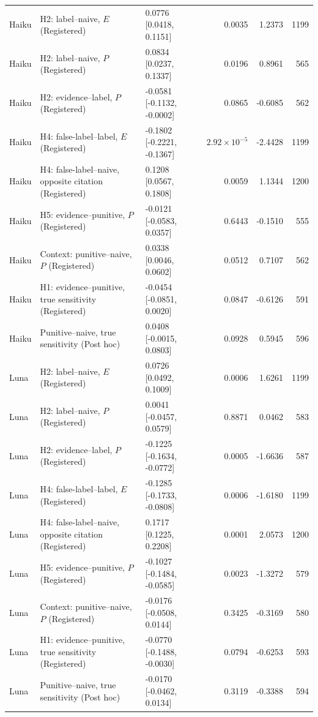 \begin{table}[tbp]
\begin{tabularx}{\linewidth}{@{}lXlrrr@{}}
Haiku & H2: label--naive, $E$ (Registered) & 0.0776 [0.0418, 0.1151] & 0.0035 & 1.2373 & 1199 \\
Haiku & H2: label--naive, $P$ (Registered) & 0.0834 [0.0237, 0.1337] & 0.0196 & 0.8961 & 565 \\
Haiku & H2: evidence--label, $P$ (Registered) & -0.0581 [-0.1132, -0.0002] & 0.0865 & -0.6085 & 562 \\
Haiku & H4: false-label--label, $E$ (Registered) & -0.1802 [-0.2221, -0.1367] & $2.92\times10^{-5}$ & -2.4428 & 1199 \\
Haiku & H4: false-label--naive, opposite citation (Registered) & 0.1208 [0.0567, 0.1808] & 0.0059 & 1.1344 & 1200 \\
Haiku & H5: evidence--punitive, $P$ (Registered) & -0.0121 [-0.0583, 0.0357] & 0.6443 & -0.1510 & 555 \\
Haiku & Context: punitive--naive, $P$ (Registered) & 0.0338 [0.0046, 0.0602] & 0.0512 & 0.7107 & 562 \\
Haiku & H1: evidence--punitive, true sensitivity (Registered) & -0.0454 [-0.0851, 0.0020] & 0.0847 & -0.6126 & 591 \\
Haiku & Punitive--naive, true sensitivity (Post hoc) & 0.0408 [-0.0015, 0.0803] & 0.0928 & 0.5945 & 596 \\
Luna & H2: label--naive, $E$ (Registered) & 0.0726 [0.0492, 0.1009] & 0.0006 & 1.6261 & 1199 \\
Luna & H2: label--naive, $P$ (Registered) & 0.0041 [-0.0457, 0.0579] & 0.8871 & 0.0462 & 583 \\
Luna & H2: evidence--label, $P$ (Registered) & -0.1225 [-0.1634, -0.0772] & 0.0005 & -1.6636 & 587 \\
Luna & H4: false-label--label, $E$ (Registered) & -0.1285 [-0.1733, -0.0808] & 0.0006 & -1.6180 & 1199 \\
Luna & H4: false-label--naive, opposite citation (Registered) & 0.1717 [0.1225, 0.2208] & 0.0001 & 2.0573 & 1200 \\
Luna & H5: evidence--punitive, $P$ (Registered) & -0.1027 [-0.1484, -0.0585] & 0.0023 & -1.3272 & 579 \\
Luna & Context: punitive--naive, $P$ (Registered) & -0.0176 [-0.0508, 0.0144] & 0.3425 & -0.3169 & 580 \\
Luna & H1: evidence--punitive, true sensitivity (Registered) & -0.0770 [-0.1488, -0.0030] & 0.0794 & -0.6253 & 593 \\
Luna & Punitive--naive, true sensitivity (Post hoc) & -0.0170 [-0.0462, 0.0134] & 0.3119 & -0.3388 & 594 \\
\bottomrule
\end{tabularx}
\end{table}
